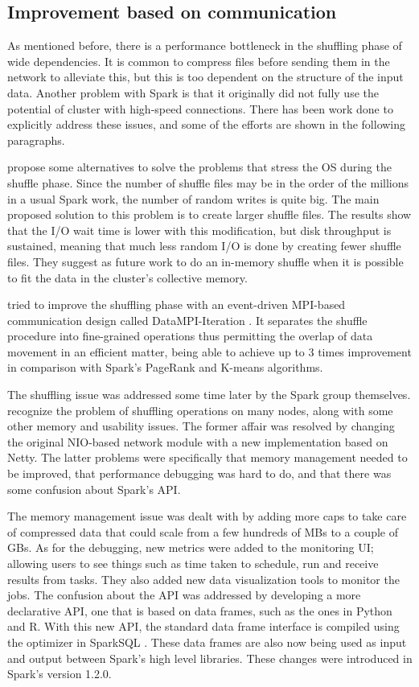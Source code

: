 \documentclass{article}
\begin{document}
\subsection{Improvement based on communication}

As mentioned before, there is a performance bottleneck in the shuffling phase of wide dependencies. It is common to compress files before sending them in the network to alleviate this, but this is too dependent on the structure of the input data. Another problem with Spark is that it originally did not fully use the potential of cluster with high-speed connections. There has been work done to explicitly address these issues, and some of the efforts are shown in the following paragraphs.

\citeauthor{davidson2013optimizing} \cite{davidson2013optimizing} propose some alternatives to solve the problems that stress the OS during the shuffle phase. Since the number of shuffle files may be in the order of the millions in a usual Spark work, the number of random writes is quite big. The main proposed solution to this problem is to create larger shuffle files. The results show that the I/O wait time is lower with this modification, but disk throughput is sustained, meaning that much less random I/O is done by creating fewer shuffle files. They suggest as future work to do an in-memory shuffle when it is possible to fit the data in the cluster's collective memory.

\citeauthor{Liang2015} tried to improve the shuffling phase with an event-driven MPI-based communication design called DataMPI-Iteration \cite{Liang2015}. It separates the shuffle procedure into fine-grained operations thus permitting the overlap of data movement in an efficient matter, being able to achieve up to 3 times improvement in comparison with Spark's PageRank and K-means algorithms.

The shuffling issue was addressed some time later by the Spark group themselves. \citeauthor{Armbrust2015} \cite{Armbrust2015} recognize the problem of shuffling operations on many nodes, along with some other memory and usability issues. The former affair was resolved by changing the original NIO-based network module with a new implementation based on Netty. The latter problems were specifically that memory management needed to be improved, that performance debugging was hard to do, and that there was some confusion about Spark's API.

The memory management issue was dealt with by adding more caps to take care of compressed data that could scale from a few hundreds of MBs to a couple of GBs. As for the debugging, new metrics were added to the monitoring UI; allowing users to see things such as time taken to schedule, run and receive results from tasks. They also added new data visualization tools to monitor the jobs. The confusion about the API was addressed by developing a more declarative API, one that is based on data frames, such as the ones in Python and R. With this new API, the standard data frame interface is compiled using the optimizer in SparkSQL \cite{armbrust2015spark}. These data frames are also now being used as input and output between Spark's high level libraries. These changes were introduced in Spark's version 1.2.0.
\end{document}
